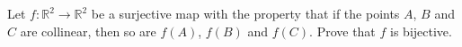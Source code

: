 Let $f : \mathbb{R}^2 \to \mathbb{R}^2$ be a surjective map with the property
that if the points $A$, $B$ and $C$ are collinear, then so are $f(A)$, $f(B)$
and $f(C)$. Prove that $f$ is bijective.
